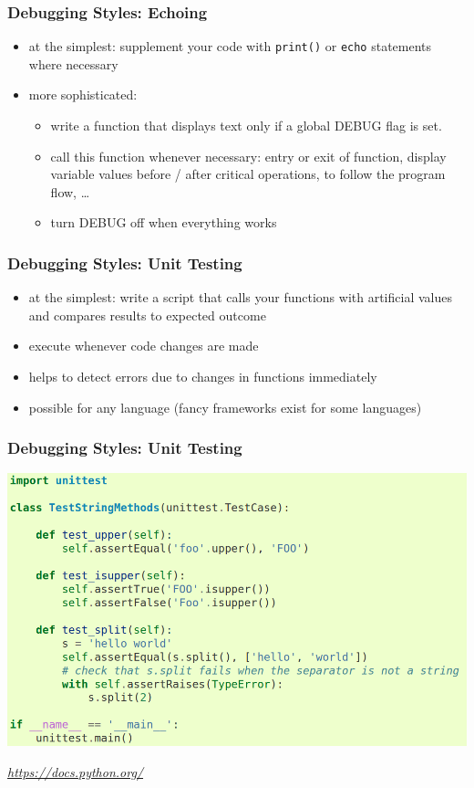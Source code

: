 \documentclass[unknownkeysallowed]{beamer}
\begin{document}
\begin{frame}
	\frametitle{Debugging Styles: Echoing}
	\begin{itemize}
	\item at the simplest: supplement your code with {\tt print()} or {\tt echo} statements where necessary
	\item more sophisticated: 
		\begin{itemize}
			\item write a function that displays text only if a global DEBUG flag is set.
			\item call this function whenever necessary: entry or exit of function, display variable values before / after critical operations, to follow the program flow, \dots
			\item turn DEBUG off when everything works
		\end{itemize}
	\end{itemize}
\end{frame}

\begin{frame}
	\frametitle{Debugging Styles: Unit Testing}
	\begin{itemize}
		\item at the simplest: write a script that calls your functions with artificial values and compares results to expected outcome
		\item execute whenever code changes are made
		\item helps to detect errors due to changes in functions immediately
		\item possible for any language (fancy frameworks exist for some languages)
	\end{itemize}
\end{frame}


\begin{frame}
\frametitle{Debugging Styles: Unit Testing}
	\begin{center}
		\includegraphics[width=.8\textwidth]{../figures/python_unittest.png}	
	\end{center}
	\begin{flushleft}
	\tiny{\emph{\url{https://docs.python.org/}}}
	\end{flushleft}	
\end{frame}
\end{document}
